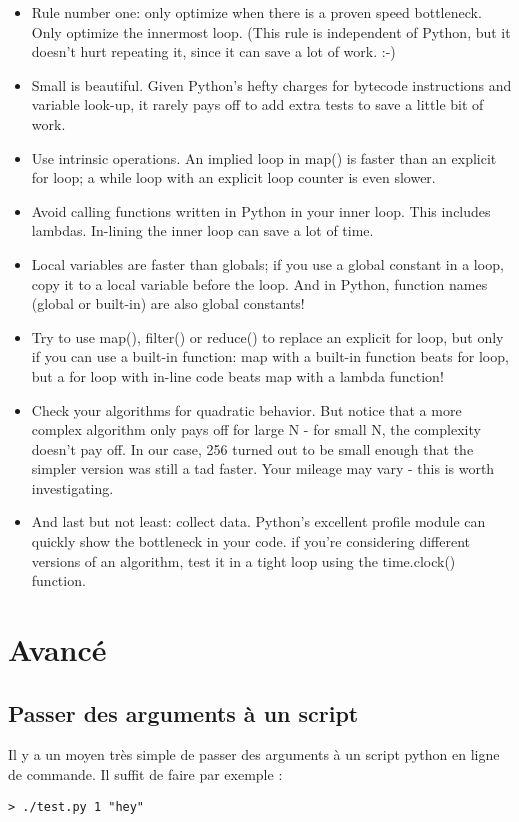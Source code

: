 \documentclass[a4paper,twoside]{article}
\begin{document}
\begin{itemize}
\item Rule number one: only optimize when there is a proven speed bottleneck. Only optimize the innermost loop. (This rule is independent of Python, but it doesn't hurt repeating it, since it can save a lot of work. :-)
\item Small is beautiful. Given Python's hefty charges for bytecode instructions and variable look-up, it rarely pays off to add extra tests to save a little bit of work.
\item Use intrinsic operations. An implied loop in map() is faster than an explicit for loop; a while loop with an explicit loop counter is even slower.
\item Avoid calling functions written in Python in your inner loop. This includes lambdas. In-lining the inner loop can save a lot of time.
\item Local variables are faster than globals; if you use a global constant in a loop, copy it to a local variable before the loop. And in Python, function names (global or built-in) are also global constants!
\item Try to use map(), filter() or reduce() to replace an explicit for loop, but only if you can use a built-in function: map with a built-in function beats for loop, but a for loop with in-line code beats map with a lambda function!
\item Check your algorithms for quadratic behavior. But notice that a more complex algorithm only pays off for large N - for small N, the complexity doesn't pay off. In our case, 256 turned out to be small enough that the simpler version was still a tad faster. Your mileage may vary - this is worth investigating.
\item And last but not least: collect data. Python's excellent profile module can quickly show the bottleneck in your code. if you're considering different versions of an algorithm, test it in a tight loop using the time.clock() function. 
\end{itemize}

\section{Avancé}
\subsection{Passer des arguments à un script}
Il y a un moyen très simple de passer des arguments à un script python en ligne de commande. Il suffit de faire par exemple :
\begin{verbatim}
> ./test.py 1 "hey"
\end{verbatim}
\end{document}
